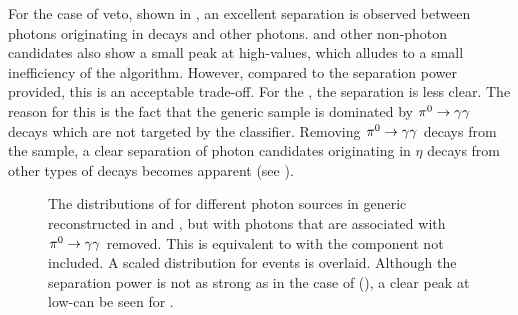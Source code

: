 For the case of \piz veto, shown in , an excellent separation is observed between photons originating in \piz decays and other photons.
\BtoXsgamma and other non-\piz photon candidates also show a small peak at high-\piVeto values, which alludes to a small inefficiency of the algorithm.
However, compared to the separation power provided, this is an acceptable trade-off.
For the \etaVeto, the separation is less clear.
The reason for this is the fact that the generic \MC sample is dominated by $\pi^0\rightarrow\gamma\gamma$ decays which are not targeted by the \etaVeto classifier.
Removing $\pi^0\rightarrow\gamma\gamma$ decays from the sample, a clear separation of photon candidates originating in $\eta$ decays from other types of decays becomes apparent (see ).

\begin{figure}[htbp!]
    \centering
    \caption{\label{fig:vetos_nopi} The distributions of \etaVeto
    for different photon sources in generic \MC reconstructed in \feiBp and \feiBz, but with photons that are associated with $\pi^0\rightarrow\gamma\gamma$ removed.
    This is equivalent to  with the \piz component not included.
    A scaled \etaVeto distribution for \BtoXsgamma events is overlaid.
    Although the separation power is not as strong as in the case of \piVeto (), a clear peak at low-\etaVeto can be seen for \BtoXsgamma.
    }
\end{figure}

